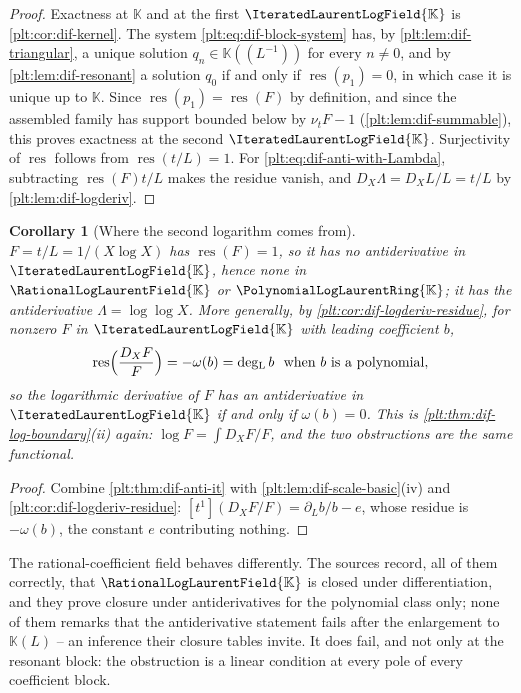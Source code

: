 \documentclass[11pt,oneside]{article}
\theoremstyle{plain}
\newtheorem{corollary}[theorem]{Corollary}
\theoremstyle{definition}
\theoremstyle{remark}
\newcommand{\K}{\mathbb{K}}
\newcommand{\PLlau}{\PolynomialLogLaurentRing{\K}}       %
\newcommand{\PLrat}{\RationalLogLaurentField{\K}}        %
\newcommand{\PLit}{\IteratedLaurentLogField{\K}}         %
\newcommand{\ordt}{\nu_{t}}                              %
\DeclareMathOperator{\degL}{deg_{L}}
\newcommand{\DX}{D_{X}}                                  %
\begin{document}
\begin{proof}
Exactness at \(\K\) and at the first \(\PLit\) is \cref{plt:cor:dif-kernel}.
The system \cref{plt:eq:dif-block-system} has, by
\cref{plt:lem:dif-triangular}, a unique solution \(q_{n}\in\K((L^{-1}))\) for
every \(n\ne0\), and by \cref{plt:lem:dif-resonant} a solution \(q_{0}\) if and
only if \(\operatorname{res}(p_{1})=0\), in which case it is unique up to
\(\K\).  Since \(\operatorname{res}(p_{1})=\operatorname{res}(F)\) by
definition, and since the assembled family has support bounded below by
\(\ordt F-1\) (\cref{plt:lem:dif-summable}), this proves exactness at the
second \(\PLit\).  Surjectivity of \(\operatorname{res}\) follows from
\(\operatorname{res}(t/L)=1\).  For
\cref{plt:eq:dif-anti-with-Lambda}, subtracting
\(\operatorname{res}(F)t/L\) makes the residue vanish, and
\(\DX\Lambda=\DX L/L=t/L\) by \cref{plt:lem:dif-logderiv}.
\end{proof}

\begin{corollary}[Where the second logarithm comes from]
\label{plt:cor:dif-loglog}
\(F=t/L=1/(X\log X)\) has \(\operatorname{res}(F)=1\), so it has no
antiderivative in \(\PLit\), hence none in \(\PLrat\) or \(\PLlau\); it has the
antiderivative \(\Lambda=\log\log X\).  More generally, by
\cref{plt:cor:dif-logderiv-residue}, for nonzero \(F\) in \(\PLit\) with
leading coefficient \(b\),
\begin{equation}\label{plt:eq:dif-res-log-derivative}
  \operatorname{res}\Bigl(\frac{\DX F}{F}\Bigr)=-\omega(b)
  =\degL b\ \text{ when }b\text{ is a polynomial},
\end{equation}
so the logarithmic derivative of \(F\) has an antiderivative in \(\PLit\) if
and only if \(\omega(b)=0\).  This is \cref{plt:thm:dif-log-boundary}(ii)
again: \(\log F=\int\DX F/F\), and the two obstructions are the same functional.
\end{corollary}

\begin{proof}
Combine \cref{plt:thm:dif-anti-it} with
\cref{plt:lem:dif-scale-basic}(iv) and
\cref{plt:cor:dif-logderiv-residue}: \([t^{1}](\DX F/F)=\partial_{L}b/b-e\),
whose residue is \(-\omega(b)\), the constant \(e\) contributing nothing.
\end{proof}

The rational-coefficient field behaves differently.  The sources record, all of
them correctly, that \(\PLrat\) is closed under differentiation, and they prove
closure under antiderivatives for the polynomial class only; none of them
remarks that the antiderivative statement fails after the enlargement to
\(\K(L)\) -- an inference their closure tables invite.  It does fail, and not
only at the resonant block: the obstruction is a linear condition at every pole
of every coefficient block.
\end{document}
